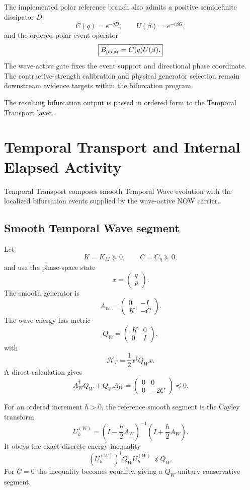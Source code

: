 The implemented polar reference branch also admits a positive semidefinite dissipator $D$,
\[
C(q)=e^{-qD},
\qquad
U(\beta)=e^{-i\beta G},
\]
and the ordered polar event operator
\[
\boxed{
B_{\rm polar}=C(q)U(\beta).
}
\]
The wave-active gate fixes the event support and directional phase coordinate.  The contractive-strength calibration and physical generator selection remain downstream evidence targets within the bifurcation program.

The resulting bifurcation output is passed in ordered form to the Temporal Transport layer.


\chapter{Temporal Transport and Internal Elapsed Activity}

Temporal Transport composes smooth Temporal Wave evolution with the localized bifurcation events supplied by the wave-active NOW carrier.

\section{Smooth Temporal Wave segment}

Let
\[
K=K_M\succeq0,
\qquad
C=C_\eta\succeq0,
\]
and use the phase-space state
\[
x=\begin{pmatrix}q\\p\end{pmatrix}.
\]
The smooth generator is
\[
\boxed{
A_W=
\begin{pmatrix}
0&-I\\
K&-C
\end{pmatrix}.
}
\]
The wave energy has metric
\[
\boxed{
Q_W=
\begin{pmatrix}
K&0\\
0&I
\end{pmatrix},
}
\]
with
\[
\mathcal H_T=\frac12x^\dagger Q_Wx.
\]
A direct calculation gives
\[
\boxed{
A_W^\dagger Q_W+Q_WA_W
=
\begin{pmatrix}
0&0\\
0&-2C
\end{pmatrix}\preceq0.
}
\]

For an ordered increment $h>0$, the reference smooth segment is the Cayley transform
\[
\boxed{
U_h^{(W)}
=\left(I-\frac h2A_W\right)^{-1}
\left(I+\frac h2A_W\right).
}
\]
It obeys the exact discrete energy inequality
\[
\boxed{
(U_h^{(W)})^\dagger Q_WU_h^{(W)}\preceq Q_W.
}
\]
For $C=0$ the inequality becomes equality, giving a $Q_W$-unitary conservative segment.

